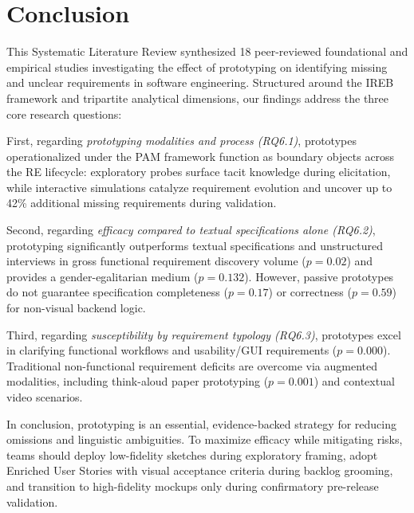 \documentclass[conference]{IEEEtran}
\begin{document}
\section{Conclusion}
\label{sec:conclusion}

This Systematic Literature Review synthesized 18 peer-reviewed foundational and empirical studies investigating the effect of prototyping on identifying missing and unclear requirements in software engineering. Structured around the IREB framework and tripartite analytical dimensions, our findings address the three core research questions:

First, regarding \textit{prototyping modalities and process (RQ6.1)}, prototypes operationalized under the PAM framework function as boundary objects across the RE lifecycle: exploratory probes surface tacit knowledge during elicitation, while interactive simulations catalyze requirement evolution and uncover up to 42\% additional missing requirements during validation.

Second, regarding \textit{efficacy compared to textual specifications alone (RQ6.2)}, prototyping significantly outperforms textual specifications and unstructured interviews in gross functional requirement discovery volume ($p = 0.02$) and provides a gender-egalitarian medium ($p = 0.132$). However, passive prototypes do not guarantee specification completeness ($p = 0.17$) or correctness ($p = 0.59$) for non-visual backend logic.

Third, regarding \textit{susceptibility by requirement typology (RQ6.3)}, prototypes excel in clarifying functional workflows and usability/GUI requirements ($p = 0.000$). Traditional non-functional requirement deficits are overcome via augmented modalities, including think-aloud paper prototyping ($p = 0.001$) and contextual video scenarios.

In conclusion, prototyping is an essential, evidence-backed strategy for reducing omissions and linguistic ambiguities. To maximize efficacy while mitigating risks, teams should deploy low-fidelity sketches during exploratory framing, adopt Enriched User Stories with visual acceptance criteria during backlog grooming, and transition to high-fidelity mockups only during confirmatory pre-release validation.

{\footnotesize


}
\end{document}
